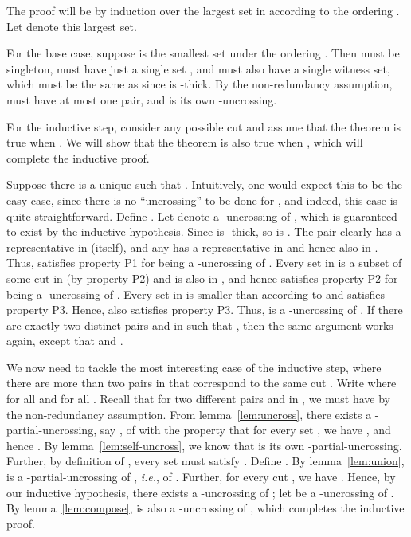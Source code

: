 \documentclass[11pt]{article}
\newenvironment{proofof}[1]{\noindent{\bf Proof of #1:}}{\par}
\begin{document}
\begin{proofof}{Theorem~\ref{thm:uncross}}
  The proof will be by induction over the largest set in  according
  to the ordering . Let  denote this largest set.

  For the base case, suppose  is the smallest set  under the
  ordering . Then  must be singleton,  must have just a
  single set , and  must also have a single witness set, which
  must be the same as  since  is -thick. By the
  non-redundancy assumption,  must have at most one pair, and is its
  own -uncrossing.

  For the inductive step, consider any possible cut  and assume that the
  theorem is true when . We will show that the theorem is
  also true when , which will complete the inductive proof.

  Suppose there is a unique  such that . Intuitively, one would expect this to be the easy case, since there is
  no ``uncrossing'' to be done for , and indeed, this case is quite
  straightforward. Define . Let  denote a
  -uncrossing of , which is guaranteed to exist by the
  inductive hypothesis. Since  is -thick, so is . The pair  clearly has a representative in
   (itself), and any  has a
  representative in  and hence also in . Thus, 
  satisfies property P1 for being a -uncrossing of .  Every set
  in  is a subset of some cut in  (by property P2)
  and  is also in , and hence  satisfies property
  P2 for being a -uncrossing of . Every set in  is
  smaller than  according to  and  satisfies
  property P3. Hence,  also satisfies property P3. Thus, 
  is a -uncrossing of . If there are exactly two distinct pairs
   and  in  such that , then the
  same argument works again, except that  and .

  We now need to tackle the most interesting case of the inductive step, where
  there are more than two pairs in  that correspond to the same cut
  . Write  where  for all
   and  for all . Recall
  that for two different pairs  and  in , we must
  have  by the non-redundancy assumption. From
  lemma~\ref{lem:uncross}, there exists a -partial-uncrossing, say
  , of  with the property that for every set , we have , and hence . By
  lemma~\ref{lem:self-uncross}, we know that  is its own
  -partial-uncrossing. Further, by definition of , every set
   must satisfy . Define . By lemma~\ref{lem:union},  is a
  -partial-uncrossing of , {\em i.e.}, of
  . Further, for every cut , we have . Hence, by our inductive hypothesis, there exists a -uncrossing
  of ; let  be a -uncrossing of . By
  lemma~\ref{lem:compose},  is also a -uncrossing of
  , which completes the inductive proof.
\end{proofof}
\end{document}
